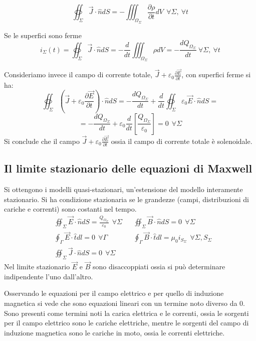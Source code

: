 \begin{equation}
\oiint_\Sigma\vec{J}\cdot\hat{n}dS = - \iiint_{\Omega_\Sigma}\frac{\partial \rho}{\partial t} dV
\ \ \forall\Sigma,\ \forall t
\end{equation}

Se le superfici sono ferme
$$
i_{\Sigma}(t) = \oiint_\Sigma\vec{J}\cdot\hat{n}dS = -\frac{d}{dt} \iiint_{\Omega_\Sigma} \rho dV = -\frac{dQ_{\Omega_\Sigma}}{dt}\ \forall\Sigma,\ \forall t
$$

Consideriamo invece il campo di corrente totale, $\vec{J} + \varepsilon_0\frac{\partial\vec{E}}{\partial t}$, con superfici ferme si ha:
$$
\oiint_{\Sigma} \left(\vec{J} + \varepsilon_0\frac{\partial\vec{E}}{\partial t}\right)\cdot\hat{n}dS = 
-\frac{dQ_{\Omega_\Sigma}}{dt} + \frac{d}{dt} \oiint_{\Sigma} \varepsilon_0\vec{E}\cdot\hat{n}dS =
$$
$$
= -\frac{dQ_{\Omega_\Sigma}}{dt} + \varepsilon_0\frac{d}{dt}\left[\frac{Q_{\Omega_\Sigma}}{\varepsilon_0}\right] = 0\ \ \forall\Sigma
$$
Si conclude che il campo $\vec{J} + \varepsilon_0\frac{\partial\vec{E}}{\partial t} $ ossia
il campo di corrente totale è solenoidale.

\newpage
\subsection{Il limite stazionario delle equazioni di Maxwell}
Si ottengono i modelli quasi-stazionari, un'estensione del modello interamente stazionario.
Si ha condizione stazionaria se le grandezze (campi, distribuzioni di cariche e correnti) sono 
costanti nel tempo.
\begin{align*}
&\oiint_{\Sigma}\vec{E}\cdot\hat{n}dS = \frac{Q_{\Omega_\Sigma}}{\varepsilon_0} \ \ \forall \Sigma &
&\oiint_{\Sigma}\vec{B}\cdot\hat{n}dS = 0 \ \ \forall\Sigma \\
&\oint_{\Gamma} \vec{E}\cdot\hat{t}dl = 0 \ \ \forall \Gamma &
&\oint_{\Gamma}\vec{B}\cdot\hat{t} dl = \mu_0 i_{S_\Sigma}\ \ \forall \Sigma,S_\Sigma \\
&\oiint_\Sigma \vec{J}\cdot\hat{n}dS = 0\ \ \forall\Sigma
\end{align*}
Nel limite stazionario $\vec{E}$ e $\vec{B}$ sono disaccoppiati ossia si può determinare
indipendente l'uno dall'altro.

Osservando le equazioni per il campo elettrico e per quello di induzione magnetica si vede 
che sono equazioni lineari con un termine noto diverso da 0.
Sono presenti come termini noti la carica elettrica e le correnti, ossia le sorgenti
per il campo elettrico sono le cariche elettriche, mentre le sorgenti del campo di induzione magnetica
sono le cariche in moto, ossia le correnti elettriche.

